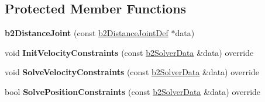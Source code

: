 \subsection*{Protected Member Functions}
\begin{DoxyCompactItemize}
\item 
\mbox{\label{classb2DistanceJoint_ad2bb6de92a47868629a7397e23256454}} 
{\bfseries b2\+Distance\+Joint} (const \mbox{\hyperlink{structb2DistanceJointDef}{b2\+Distance\+Joint\+Def}} $\ast$data)
\item 
\mbox{\label{classb2DistanceJoint_abe956dd5951651b36321098416ad99fd}} 
void {\bfseries Init\+Velocity\+Constraints} (const \mbox{\hyperlink{structb2SolverData}{b2\+Solver\+Data}} \&data) override
\item 
\mbox{\label{classb2DistanceJoint_ad42429151fb979a230f103d684d2a42c}} 
void {\bfseries Solve\+Velocity\+Constraints} (const \mbox{\hyperlink{structb2SolverData}{b2\+Solver\+Data}} \&data) override
\item 
\mbox{\label{classb2DistanceJoint_a431d12fac5ee9f6a5637321ee28119bc}} 
bool {\bfseries Solve\+Position\+Constraints} (const \mbox{\hyperlink{structb2SolverData}{b2\+Solver\+Data}} \&data) override
\end{DoxyCompactItemize}
